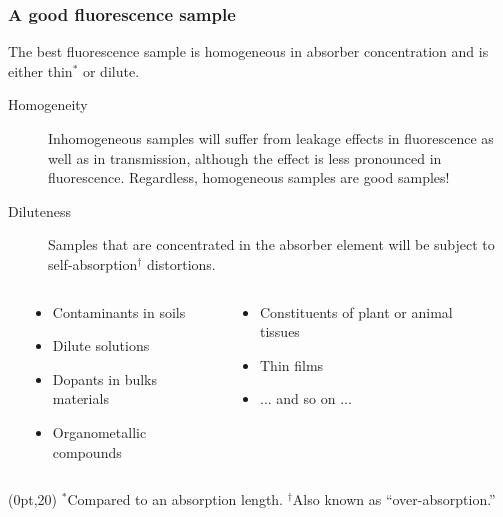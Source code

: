 \documentclass[10pt, xcolor=x11names, compress]{beamer}
\begin{document}
\begin{frame}
  \frametitle{A good fluorescence sample}
  \begin{exampleblock}{}
    The best fluorescence sample is homogeneous in absorber
    concentration and is either thin$^\ast$ or dilute.
  \end{exampleblock}
  \begin{description}
  \item[Homogeneity] Inhomogeneous samples will suffer from leakage
    effects in fluorescence as well as in transmission, although the
    effect is less pronounced in fluorescence.  Regardless,
    {\color{ExampleGreen} homogeneous samples are good samples!}
  \item[Diluteness] Samples that are concentrated in the absorber
    element will be subject to \alert{self-absorption}$^{\dagger}$
    distortions. 
  \end{description}
  \begin{columns}[T]
    \begin{column}{0.1\linewidth}
    \end{column}
    \begin{column}{0.4\linewidth}
      \begin{itemize}
      \item Contaminants in soils
      \item Dilute solutions
      \item Dopants in bulks materials
      \item Organometallic compounds
      \end{itemize}
    \end{column}
    \begin{column}{0.4\linewidth}
      \begin{itemize}
      \item Constituents of plant or animal tissues
      \item Thin films
      \item \quad ... and so on ...
      \end{itemize}
    \end{column}
    \begin{column}{0.1\linewidth}
    \end{column}
  \end{columns}
  \begin{textblock*}{0.8\linewidth}(0pt,20\TPVertModule)%
    \tiny%
    $^\ast$Compared to an absorption length.\qquad
    $^{\dagger}$Also known as ``over-absorption.''
  \end{textblock*}
\end{frame}
\end{document}
